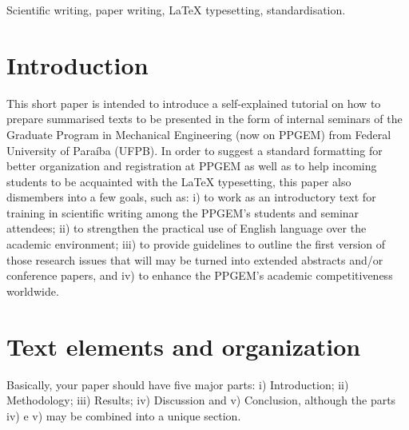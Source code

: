 \documentclass[date]{ppgem}
\begin{document}
\thispagestyle{plain}
\makeheader

\begin{multicols}{2}

\begin{keywords}
Scientific writing, paper writing, {\LaTeX} typesetting, standardisation.
\end{keywords}

\section{Introduction}

This short paper is intended to introduce a self-explained tutorial on how to prepare summarised texts to be presented in the form of internal seminars of the Graduate Program in Mechanical Engineering (now on PPGEM) from Federal University of Paraíba (UFPB). In order to suggest a standard formatting for better organization and registration at PPGEM as well as to help incoming students to be acquainted with the {\LaTeX} typesetting, this paper also dismembers into a few goals, such as: i) to work as an introductory text for training in scientific writing among the PPGEM's students and seminar attendees; ii) to strengthen the practical use of English language over the academic environment; iii) to provide guidelines to outline the first version of those research issues that will may be turned into extended abstracts and/or conference papers, and iv) to enhance the PPGEM's academic competitiveness worldwide. 

\section{Text elements and organization}

Basically, your paper should have five major parts: i) Introduction; ii) Methodology; iii) Results; iv) Discussion and v) Conclusion, although the parts iv) e v) may be combined into a unique section. 


\end{multicols}
\end{document}
